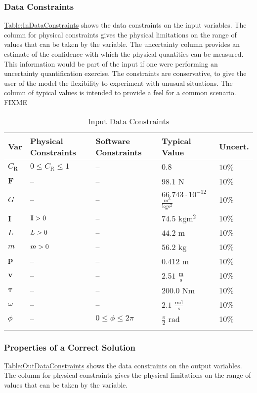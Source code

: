 \documentclass[12pt]{article}
\newcommand{\gt}{\ensuremath >}
\begin{document}
\subsubsection{Data Constraints}
\label{Sec:DataConstraints}
\hyperref[Table:InDataConstraints]{Table:InDataConstraints} shows the data constraints on the input variables. The column for physical constraints gives the physical limitations on the range of values that can be taken by the variable. The uncertainty column provides an estimate of the confidence with which the physical quantities can be measured. This information would be part of the input if one were performing an uncertainty quantification exercise. The constraints are conservative, to give the user of the model the flexibility to experiment with unusual situations. The column of typical values is intended to provide a feel for a common scenario. FIXME

\begin{longtable}{l l l l l}
\toprule
\textbf{Var} & \textbf{Physical Constraints} & \textbf{Software Constraints} & \textbf{Typical Value} & \textbf{Uncert.}
\\
\midrule
\endhead
${C_{\text{R}}}$ & $0\leq{}{C_{\text{R}}}\leq{}1$ & -- & $0.8$ & 10$\%$
\\
$\mathbf{F}$ & -- & -- & $98.1$ ${\text{N}}$ & 10$\%$
\\
$G$ & -- & -- & $66.743\cdot{}10^{-12}$ $\frac{\text{m}^{3}}{\text{kg}\text{s}^{2}}$ & 10$\%$
\\
$\mathbf{I}$ & $\mathbf{I}\gt{}0$ & -- & $74.5$ $\text{kg}\text{m}^{2}$ & 10$\%$
\\
$L$ & $L\gt{}0$ & -- & $44.2$ ${\text{m}}$ & 10$\%$
\\
$m$ & $m\gt{}0$ & -- & $56.2$ ${\text{kg}}$ & 10$\%$
\\
$\mathbf{p}$ & -- & -- & $0.412$ ${\text{m}}$ & 10$\%$
\\
$\mathbf{v}$ & -- & -- & $2.51$ $\frac{\text{m}}{\text{s}}$ & 10$\%$
\\
$\mathbf{τ}$ & -- & -- & $200.0$ $\text{N}\text{m}$ & 10$\%$
\\
$ω$ & -- & -- & $2.1$ $\frac{\text{rad}}{\text{s}}$ & 10$\%$
\\
$ϕ$ & -- & $0\leq{}ϕ\leq{}2 π$ & $\frac{π}{2}$ ${\text{rad}}$ & 10$\%$
\\
\bottomrule
\caption{Input Data Constraints}
\label{Table:InDataConstraints}
\end{longtable}
\subsubsection{Properties of a Correct Solution}
\label{Sec:CorSolProps}
\hyperref[Table:OutDataConstraints]{Table:OutDataConstraints} shows the data constraints on the output variables. The column for physical constraints gives the physical limitations on the range of values that can be taken by the variable.
\end{document}
